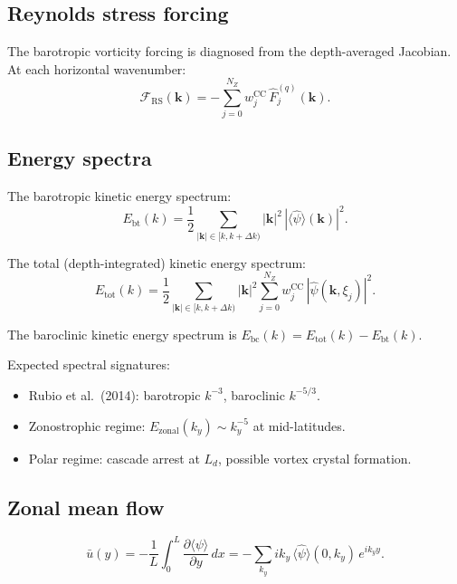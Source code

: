 \documentclass[11pt]{article}
\newcommand{\pderiv}[2]{\frac{\partial #1}{\partial #2}}
\newcommand{\Ld}{L_d}
\newcommand{\kh}{|\bm{k}|}
\newcommand{\avg}[1]{\langle #1 \rangle}
\newcommand{\hhat}[1]{\widehat{#1}}
\begin{document}
\subsection{Reynolds stress forcing}

The barotropic vorticity forcing is diagnosed from the depth-averaged Jacobian. At each horizontal wavenumber:
\begin{equation}
\mathcal{F}_{\mathrm{RS}}(\bm{k}) = -\sum_{j=0}^{N_Z} w^{\mathrm{CC}}_j\,\hhat{F}^{(q)}_j(\bm{k}).
\end{equation}

\subsection{Energy spectra}

The barotropic kinetic energy spectrum:
\begin{equation}
E_{\mathrm{bt}}(k) = \frac{1}{2}\sum_{\kh \in [k, k+\Delta k)} \kh^2\,|\avg{\hhat\psi}(\bm{k})|^2.
\end{equation}

The total (depth-integrated) kinetic energy spectrum:
\begin{equation}
E_{\mathrm{tot}}(k) = \frac{1}{2}\sum_{\kh \in [k, k+\Delta k)} \kh^2 \sum_{j=0}^{N_Z} w^{\mathrm{CC}}_j\,|\hhat\psi(\bm{k}, \xi_j)|^2.
\end{equation}

The baroclinic kinetic energy spectrum is $E_{\mathrm{bc}}(k) = E_{\mathrm{tot}}(k) - E_{\mathrm{bt}}(k)$.

Expected spectral signatures:
\begin{itemize}[nosep]
\item Rubio et al.\ (2014): barotropic $k^{-3}$, baroclinic $k^{-5/3}$.
\item Zonostrophic regime: $E_{\mathrm{zonal}}(k_y) \sim k_y^{-5}$ at mid-latitudes.
\item Polar regime: cascade arrest at $\Ld$, possible vortex crystal formation.
\end{itemize}

\subsection{Zonal mean flow}

\begin{equation}
\bar{u}(y) = -\frac{1}{L}\int_0^L \pderiv{\avg{\psi}}{y}\,dx = -\sum_{k_y} ik_y\,\avg{\hhat\psi}(0,k_y)\,e^{ik_y y}.
\end{equation}
\end{document}
